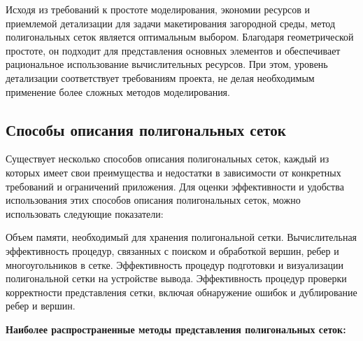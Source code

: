 Исходя из требований к простоте моделирования, экономии ресурсов и приемлемой детализации для задачи макетирования загородной среды, метод полигональных сеток является оптимальным выбором. Благодаря геометрической простоте, он подходит для представления основных элементов и обеспечивает рациональное использование вычислительных ресурсов. При этом, уровень детализации соответствует требованиям проекта, не делая необходимым применение более сложных методов моделирования.

\subsection{Способы описания полигональных сеток}

Существует несколько способов описания полигональных сеток, каждый из которых имеет свои преимущества и недостатки в зависимости от конкретных требований и ограничений приложения. Для оценки эффективности и удобства использования этих способов описания полигональных сеток, можно использовать следующие показатели:

    Объем памяти, необходимый для хранения полигональной сетки.
    Вычислительная эффективность процедур, связанных с поиском и обработкой вершин, ребер и многоугольников в сетке.
    Эффективность процедур подготовки и визуализации полигональной сетки на устройстве вывода.
    Эффективность процедур проверки корректности представления сетки, включая обнаружение ошибок и дублирование ребер и вершин.

 \textbf{Наиболее распространенные методы представления полигональных сеток:}
 
